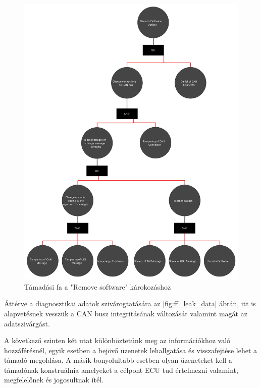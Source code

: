 \begin{figure}[!ht]
	\centering
	\includegraphics[width=120mm, keepaspectratio]{figures/AT-SECSW-02.png}
	\caption{Támadási fa a "Remove software" károkozáshoz} 
	\label{fig:ff_remove_sw}
\end{figure}

\newpage

Áttérve a diagnosztikai adatok szivárogtatására az \ref{fig:ff_leak_data} ábrán, itt is alapvetésnek vesszük a CAN busz integritásának változását valamint magát az adatszivárgást.

A következő szinten két utat különböztetünk meg az információkhoz való hozzáférésnél, egyik esetben a bejövő üzenetek lehallgatása és visszafejtése lehet a támadó megoldása. A másik bonyolultabb esetben olyan üzeneteket kell a támadónak konstruálnia amelyeket a célpont ECU tud értelmezni valamint, megfelelőnek és jogosultnak ítél.


